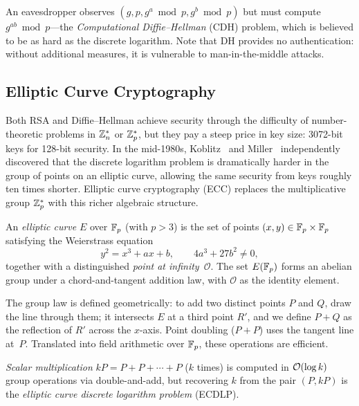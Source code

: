 An eavesdropper observes $(g, p, g^a \bmod p, g^b \bmod p)$ but must compute $g^{ab} \bmod p$---the \emph{Computational Diffie--Hellman} (CDH) problem, which is believed to be as hard as the discrete logarithm.  Note that DH provides no authentication: without additional measures, it is vulnerable to man-in-the-middle attacks.

\subsection{Elliptic Curve Cryptography}
\label{subsec:ecc}

Both RSA and Diffie--Hellman achieve security through the difficulty of number-theoretic problems in $\mathbb{Z}_n^*$ or $\mathbb{Z}_p^*$, but they pay a steep price in key size: 3072-bit keys for 128-bit security.  In the mid-1980s, Koblitz~\cite{Koblitz1987} and Miller~\cite{Miller1985} independently discovered that the discrete logarithm problem is dramatically harder in the group of points on an elliptic curve, allowing the same security from keys roughly ten times shorter.  Elliptic curve cryptography (ECC) replaces the multiplicative group $\mathbb{Z}_p^*$ with this richer algebraic structure.

\begin{definition}
\label{def:elliptic-curve}
An \emph{elliptic curve} $E$ over $\mathbb{F}_p$ (with $p > 3$) is the set of points $(x, y) \in \mathbb{F}_p \times \mathbb{F}_p$ satisfying the Weierstrass equation
\begin{equation}
\label{eq:weierstrass}
y^2 = x^3 + ax + b, \qquad 4a^3 + 27b^2 \neq 0,
\end{equation}
together with a distinguished \emph{point at infinity}~$\mathcal{O}$.  The set $E(\mathbb{F}_p)$ forms an abelian group under a chord-and-tangent addition law, with $\mathcal{O}$ as the identity element.
\end{definition}

The group law is defined geometrically: to add two distinct points $P$ and $Q$, draw the line through them; it intersects $E$ at a third point $R'$, and we define $P + Q$ as the reflection of $R'$ across the $x$-axis.  Point doubling ($P + P$) uses the tangent line at~$P$.  Translated into field arithmetic over $\mathbb{F}_p$, these operations are efficient.

\emph{Scalar multiplication} $kP = P + P + \cdots + P$ ($k$ times) is computed in $\mathcal{O}(\log k)$ group operations via double-and-add, but recovering $k$ from the pair $(P, kP)$ is the \emph{elliptic curve discrete logarithm problem} (ECDLP).


